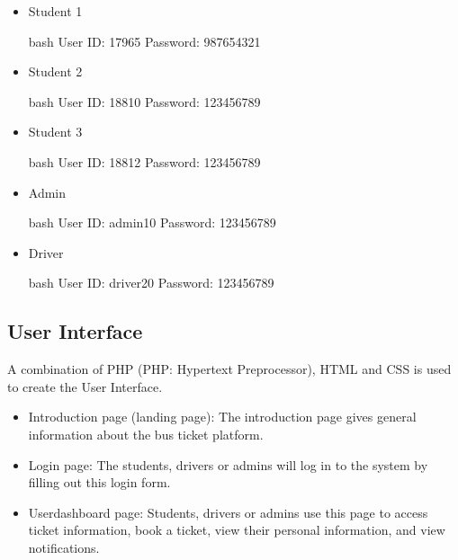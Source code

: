     \begin{itemize}
        \item Student 1
            \begin{code}{bash}
                User ID: 17965
                Password: 987654321
            \end{code}


        \item Student 2
            \begin{code}{bash}
                User ID: 18810
                Password: 123456789
            \end{code}


        \item Student 3
            \begin{code}{bash}
                User ID: 18812
                Password: 123456789
            \end{code}


        \item Admin
            \begin{code}{bash}
                User ID: admin10
                Password: 123456789
            \end{code}


        \item Driver
            \begin{code}{bash}
                User ID: driver20
                Password: 123456789
            \end{code}
    \end{itemize}

    

\subsection{User Interface}
\noindent A combination of PHP (PHP: Hypertext Preprocessor), HTML and CSS is used to create the User Interface.
\begin{itemize}
    \item Introduction page (landing page): The introduction page gives general information about the bus ticket platform.
    \item Login page: The students, drivers or admins will log in to the system by filling out this login form.
    \item Userdashboard page: Students, drivers or admins use this page to access ticket information, book a ticket, view their personal information, and view notifications.
\end{itemize}

